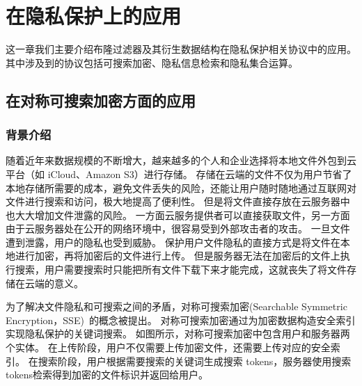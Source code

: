 
\chapter{在隐私保护上的应用}\label{chp:application}


这一章我们主要介绍布隆过滤器及其衍生数据结构在隐私保护相关协议中的应用。
其中涉及到的协议包括可搜索加密、隐私信息检索和隐私集合运算。

\section{在对称可搜索加密方面的应用}

\subsection{背景介绍}

随着近年来数据规模的不断增大，越来越多的个人和企业选择将本地文件外包到云平台（如 iCloud、Amazon S3）进行存储。
存储在云端的文件不仅为用户节省了本地存储所需要的成本，避免文件丢失的风险，还能让用户随时随地通过互联网对文件进行搜索和访问，极大地提高了便利性。
但是将文件直接存放在云服务器中也大大增加文件泄露的风险。
一方面云服务提供者可以直接获取文件，另一方面由于云服务器处在公开的网络环境中，很容易受到外部攻击者的攻击。
一旦文件遭到泄露，用户的隐私也受到威胁。
保护用户文件隐私的直接方式是将文件在本地进行加密，再将加密后的文件进行上传。
但是服务器无法在加密后的文件上执行搜索，用户需要搜索时只能把所有文件下载下来才能完成，这就丧失了将文件存储在云端的意义。

为了解决文件隐私和可搜索之间的矛盾，对称可搜索加密(Searchable Symmetric Encryption，SSE)~\cite{song2000practical,curtmola2006searchable}的概念被提出。
对称可搜索加密通过为加密数据构造安全索引实现隐私保护的关键词搜索。
如图所示，对称可搜索加密中包含用户和服务器两个实体。
在上传阶段，用户不仅需要上传加密文件，还需要上传对应的安全索引。
在搜索阶段，用户根据需要搜索的关键词生成搜索 tokens，服务器使用搜索tokens检索得到加密的文件标识并返回给用户。

